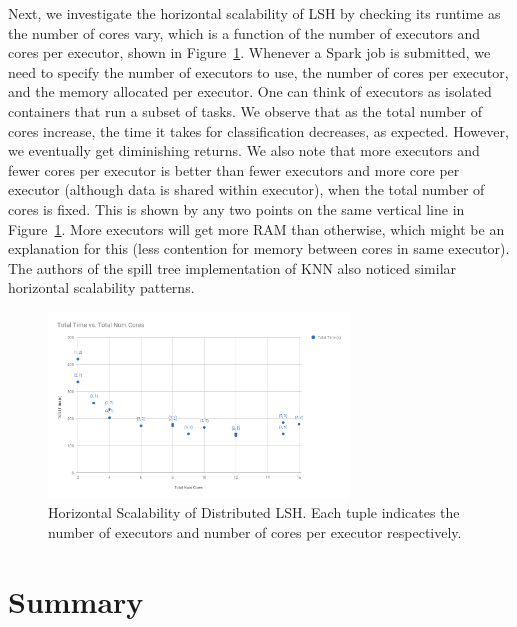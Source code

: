 \documentclass[letterpaper,twocolumn,10pt]{article}
\theoremstyle{definition}
\begin{document}
Next, we investigate the horizontal scalability of LSH by checking its runtime as the number of cores 
vary, which is a function of the number of executors and cores per executor, shown in 
Figure~\ref{figure:scalability}. Whenever a Spark job is submitted, we need to specify the number of 
executors to use, the number of cores per executor, and the memory allocated per executor. One can 
think of executors as isolated containers that run a subset of tasks. We observe that as the total 
number of cores increase, the time it takes for classification decreases, as expected. However, we 
eventually get diminishing returns. We also note that more executors and fewer cores per executor is 
better than fewer executors and more core per executor (although data is shared within executor), 
when the total number of cores is fixed. This is shown by any two points on the same vertical line in 
Figure~\ref{figure:scalability}. More executors will get more RAM than otherwise, which might be an 
explanation for this (less contention for memory between cores in same executor). The authors of the 
spill tree implementation of KNN also noticed similar horizontal scalability patterns.

\begin{figure}[t]
	\center
	\includegraphics[width=8cm]{scalability.png}
	\caption{Horizontal Scalability of Distributed LSH. Each tuple indicates the number of executors and 
	number of cores per executor respectively.}
	\label{figure:scalability}
\end{figure}

\section{Summary}
\end{document}
